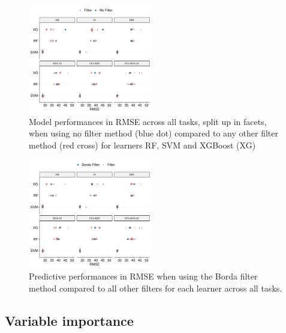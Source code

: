 \documentclass[final]{IEEEtran}
\begin{document}
\begin{figure} [t!]
	\centering
	\begin{center}
		\includegraphics[width=0.48\textwidth] {filter-effect-all-vs-no-filter-1.pdf}
		\caption{Model performances in RMSE across all tasks, split up in facets, when using no filter method (blue dot) compared to any other filter method (red cross) for learners RF, SVM and XGBoost (XG)}\label{fig:filter-effects-no-filter}
	\end{center}
\end{figure}

\begin{figure} [t!]
	\centering
	\begin{center}
		\includegraphics[width=0.48\textwidth] {filter-effect-all-vs-borda-filter-1.pdf}
		\caption{Predictive performances in RMSE when using the Borda filter method compared to all other filters for each learner across all tasks.}\label{fig:filter-effects-borda}
	\end{center}
\end{figure}

\subsection{Variable importance}
\end{document}
